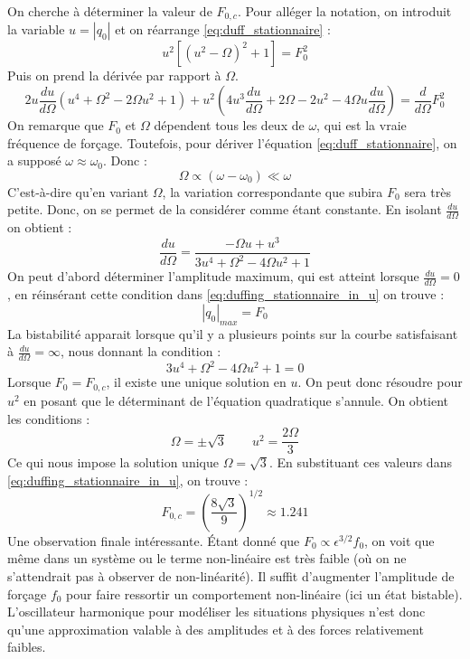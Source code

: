 On cherche à déterminer la valeur de $F_{0, c}$. Pour alléger la notation, 
on introduit la variable $u = |q_0|$ et on réarrange \eqref{eq:duff_stationnaire} :
%
\begin{equation}
    u^2[(u^2 - \Omega)^2 + 1] = F_0^2
    \label{eq:duffing_stationnaire_in_u}
\end{equation}
%
Puis on prend la dérivée par rapport à $\Omega$.
%
\begin{equation}
    2u\frac{du}{d\Omega}(u^4 + \Omega^2 - 2\Omega u^2 + 1) + u^2(4u^3\frac{du}{d\Omega} + 2\Omega - 2u^2 - 4\Omega u\frac{du}{d\Omega}) = \frac{d}{d\Omega}F_0^2
\end{equation}
%
On remarque que $F_0$ et $\Omega$ dépendent tous les deux de $\omega$, qui est la vraie fréquence de forçage. Toutefois, pour dériver l'équation \eqref{eq:duff_stationnaire}, on a supposé $\omega \approx \omega_0$. Donc : 
%
\begin{equation*}
    \Omega \propto (\omega - \omega_0) \ll \omega
\end{equation*}
%
C'est-à-dire qu'en variant $\Omega$, la variation correspondante que subira $F_0$ sera très petite. Donc, on se permet de la considérer comme étant constante. En isolant $\frac{du}{d\Omega}$ on obtient :
%
\begin{equation}
    \frac{du}{d\Omega} = \frac{-\Omega u + u^3}{3u^4 + \Omega^2 - 4\Omega u^2 + 1}
\end{equation}
%
On peut d'abord déterminer l'amplitude maximum, qui est atteint lorsque $\frac{du}{d\Omega}=0$, en réinsérant cette condition dans \eqref{eq:duffing_stationnaire_in_u} on trouve :
%
\begin{equation*}
    |q_0|_{max} = F_0
\end{equation*}
%
La bistabilité apparait lorsque qu'il y a plusieurs points sur la courbe satisfaisant à $\frac{du}{d\Omega}=\infty$, nous donnant la condition :
%
\begin{equation}
    3u^4 + \Omega^2 - 4\Omega u^2 + 1 = 0
\end{equation}
%
Lorsque $F_0 = F_{0,c}$, il existe une unique solution en $u$. On peut donc résoudre pour $u^2$ en posant que le déterminant de l'équation quadratique s'annule. On obtient les conditions :
%
\begin{equation}
    \Omega = \pm \sqrt{3}
    \qquad
    u^2 = \frac{2\Omega}{3}
\end{equation}
%
Ce qui nous impose la solution unique $\Omega = \sqrt{3}$. En substituant ces valeurs dans \eqref{eq:duffing_stationnaire_in_u}, on trouve :
%
\begin{equation}
    F_{0,c} = \left(  \frac{8\sqrt{3}}{9}  \right)^{1/2} \approx 1.241
\end{equation}
%
Une observation finale intéressante. Étant donné que $F_0 \propto \epsilon^{3/2}f_0$, 
on voit que même dans un système ou le terme non-linéaire est très faible (où on ne s'attendrait pas à observer de non-linéarité). Il suffit d'augmenter l'amplitude de forçage $f_0$ 
pour faire ressortir un comportement non-linéaire (ici un état bistable). L'oscillateur harmonique pour modéliser les situations physiques n'est donc qu'une approximation valable à des amplitudes et à des forces relativement faibles.
